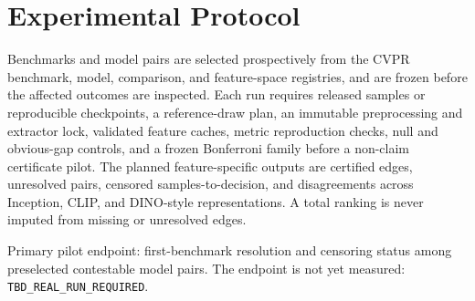 \section{Experimental Protocol}

Benchmarks and model pairs are selected prospectively from the CVPR benchmark,
model, comparison, and feature-space registries, and are frozen before the
affected outcomes are inspected. Each run requires released samples or
reproducible checkpoints, a reference-draw plan, an immutable preprocessing and
extractor lock, validated feature caches, metric reproduction checks, null and
obvious-gap controls, and a frozen Bonferroni family before a non-claim
certificate pilot. The planned feature-specific outputs are certified edges,
unresolved pairs, censored samples-to-decision, and disagreements across
Inception, CLIP, and DINO-style representations. A total ranking is never
imputed from missing or unresolved edges.

Primary pilot endpoint: first-benchmark resolution and censoring status among
preselected contestable model pairs. The endpoint is not yet measured:
\texttt{TBD\_REAL\_RUN\_REQUIRED}.
